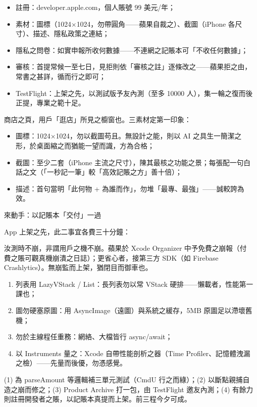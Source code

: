 \begin{itemize}
  \item 註冊：developer.apple.com，個人賬號 99 美元/年；
  \item 素材：圖標（1024×1024，勿帶圓角——蘋果自裁之）、截圖（iPhone 各尺寸）、描述、隱私政策之連結；
  \item 隱私之問卷：如實申報所收何數據——不連網之記賬本可「不收任何數據」；
  \item 審核：首提常候一至七日，見拒則依「審核之註」逐條改之——蘋果拒之由，常書之甚詳，循而行之即可；
  \item TestFlight：上架之先，以測試版予友內測（至多 10000 人），集一輪之復而後正提，專業之範十足。
\end{itemize}


商店之頁，用戶「逛店」所見之櫥窗也。三素材定第一印象：

\begin{itemize}
  \item 圖標：1024×1024，勿以截圖苟且。無設計之能，則以 AI 之具生一簡潔之形，於桌面縮之而猶能一望而識，方為合格；
  \item 截圖：至少二套（iPhone 主流之尺寸），陳其最核之功能之景；每張配一句白話之文（「一秒記一筆」較「高效記賬之方」善十倍）；
  \item 描述：首句當明「此何物 + 為誰而作」，勿堆「最專、最強」——誠較誇為效。
\end{itemize}

\begin{tcbpractice}{來動手：以記賬本「交付」一過}

App 上架之先，此二事宜各費三十分鐘：


汝測時不崩，非謂用戶之機不崩。蘋果於 Xcode Organizer 中予免費之崩報（付費之賬可觀真機崩潰之日誌）；更省心者，接第三方 SDK（如 Firebase Crashlytics）。無崩監而上架，猶閉目而御車也。


\begin{enumerate}
  \item 列表用 LazyVStack / List：長列表勿以常 VStack 硬排——懶載者，性能第一課也；
  \item 圖勿硬塞原圖：用 AsyncImage（遠圖）與系統之緩存，5MB 原圖足以滯壞舊機；
  \item 勿於主線程任重務：網絡、大檔皆行 async/await；
  \item 以 Instruments 量之：Xcode 自帶性能剖析之器（Time Profiler、記憶體洩漏之檢）——先量而後優，勿憑感覺。
\end{enumerate}

(1) 為 parseAmount 等邏輯補三單元測試（CmdU 行之而綠）；(2) 以斷點親捕自造之崩而修之；(3) Product Archive 打一包，由 TestFlight 邀友內測；(4) 有餘力則註冊開發者之賬，以記賬本真提而上架。前三程今夕可成。

\end{tcbpractice}


